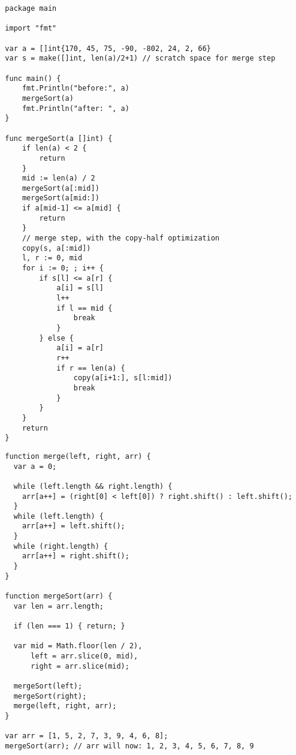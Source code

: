\documentclass{article}
\begin{document}
\begin{verbatim}
  package main
  
  import "fmt"
  
  var a = []int{170, 45, 75, -90, -802, 24, 2, 66}
  var s = make([]int, len(a)/2+1) // scratch space for merge step
  
  func main() {
      fmt.Println("before:", a)
      mergeSort(a)
      fmt.Println("after: ", a)
  }
  
  func mergeSort(a []int) {
      if len(a) < 2 {
          return
      }
      mid := len(a) / 2
      mergeSort(a[:mid])
      mergeSort(a[mid:])
      if a[mid-1] <= a[mid] {
          return
      }
      // merge step, with the copy-half optimization
      copy(s, a[:mid])
      l, r := 0, mid
      for i := 0; ; i++ {
          if s[l] <= a[r] {
              a[i] = s[l]
              l++
              if l == mid {
                  break
              }
          } else {
              a[i] = a[r]
              r++
              if r == len(a) {
                  copy(a[i+1:], s[l:mid])
                  break
              }
          }
      }
      return
  }
\end{verbatim}

\begin{verbatim}
  function merge(left, right, arr) {
    var a = 0;
  
    while (left.length && right.length) {
      arr[a++] = (right[0] < left[0]) ? right.shift() : left.shift();
    }
    while (left.length) {
      arr[a++] = left.shift();
    }
    while (right.length) {
      arr[a++] = right.shift();
    }
  }
    
  function mergeSort(arr) {
    var len = arr.length;
  
    if (len === 1) { return; }
  
    var mid = Math.floor(len / 2),
        left = arr.slice(0, mid),
        right = arr.slice(mid);
  
    mergeSort(left);
    mergeSort(right);
    merge(left, right, arr);
  }
  
  var arr = [1, 5, 2, 7, 3, 9, 4, 6, 8];
  mergeSort(arr); // arr will now: 1, 2, 3, 4, 5, 6, 7, 8, 9
\end{verbatim}
\end{document}
